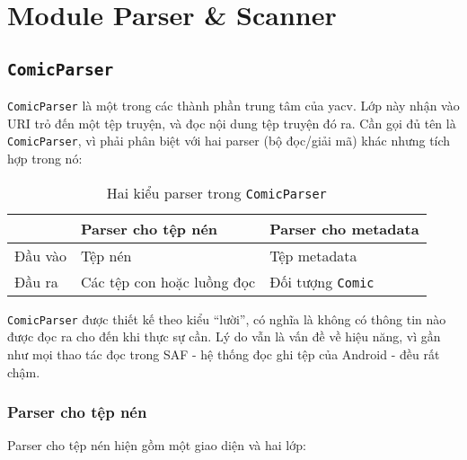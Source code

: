 \documentclass[../../../../thesis]{subfiles}
\begin{document}
\section{Module Parser \& Scanner}\label{parser-scanner-module}



\subsection{\texttt{ComicParser}}

\texttt{ComicParser} là một trong các thành phần trung tâm của yacv. Lớp này
nhận vào URI trỏ đến một tệp truyện, và đọc nội dung tệp truyện đó ra. Cần gọi
đủ tên là \texttt{ComicParser}, vì phải phân biệt với hai parser (bộ đọc/giải
mã) khác nhưng tích hợp trong nó:

\begin{table}[H]
    \centering
    \caption{Hai kiểu parser trong \texttt{ComicParser}}
    \label{tab:2-parsers}
    \begin{tabular}{l l l}
        \toprule
                & Parser cho tệp nén & Parser cho metadata \\
        \midrule
        Đầu vào & Tệp nén            & Tệp metadata \\
        Đầu ra  & Các tệp con hoặc luồng đọc & Đối tượng \texttt{Comic} \\
        \bottomrule
    \end{tabular}
\end{table}

\texttt{ComicParser} được thiết kế theo kiểu ``lười'', có nghĩa là không có
thông tin nào được đọc ra cho đến khi thực sự cần. Lý do vẫn là vấn đề về hiệu
năng, vì gần như mọi thao tác đọc trong SAF - hệ thống đọc ghi tệp của Android -
đều rất chậm.



\subsubsection{Parser cho tệp nén}

Parser cho tệp nén hiện gồm một giao diện và hai lớp:
\end{document}
